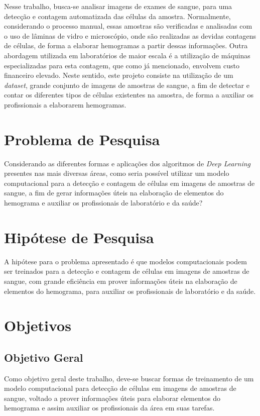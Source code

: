 Nesse trabalho, busca-se analisar imagens de exames de sangue, para uma detecção e contagem automatizada das células da amostra. Normalmente, considerando o processo manual, essas amostras são verificadas e analisadas com o uso de lâminas de vidro e microscópio, onde são realizadas as devidas contagens de células, de forma a elaborar hemogramas a partir dessas informações. Outra abordagem utilizada em laboratórios de maior escala é a utilização de máquinas especializadas para esta contagem, que como já mencionado, envolvem custo financeiro elevado. Neste sentido, este projeto consiste na utilização de um \emph{dataset}, grande conjunto de imagens de amostras de sangue, a fim de detectar e contar os diferentes tipos de células existentes na amostra, de forma a auxiliar os profissionais a elaborarem hemogramas.

\section{Problema de Pesquisa}
\label{sec:problema}

Considerando as diferentes formas e aplicações dos algoritmos de \emph{Deep Learning} presentes nas mais diversas áreas, como seria possível utilizar um modelo computacional para a detecção e contagem de células em imagens de amostras de sangue, a fim de gerar informações úteis na elaboração de elementos do hemograma e auxiliar os profissionais de laboratório e da saúde?

\section{Hipótese de Pesquisa}
\label{sec:hipotese}
A hipótese para o problema apresentado é que modelos computacionais podem ser treinados para a detecção e contagem de células em imagens de amostras de sangue, com grande eficiência em prover informações úteis na elaboração de elementos do hemograma, para auxiliar os profissionais de laboratório e da saúde.

\section{Objetivos}
\label{sec:objetivos}

\subsection{Objetivo Geral}
Como objetivo geral deste trabalho, deve-se buscar formas de treinamento de um modelo computacional para detecção de células em imagens de amostras de sangue, voltado a prover informações úteis para elaborar elementos do hemograma e assim auxiliar os profissionais da área em suas tarefas.

